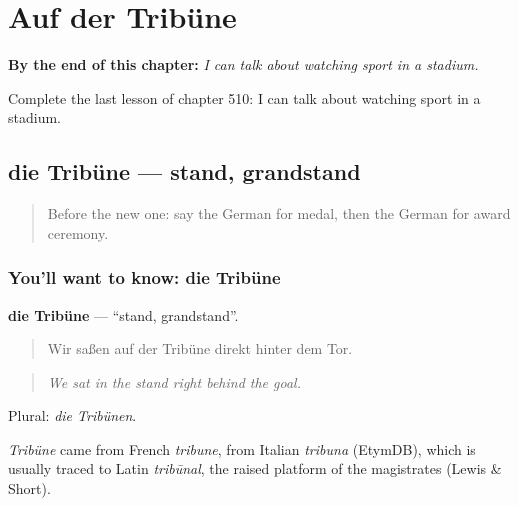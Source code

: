 
\chapter{Auf der Tribüne}
\label{ch:ge-auf-der-tribune}

\begin{chapteropening}
\textbf{By the end of this chapter:} \emph{I can talk about watching sport in a stadium.}

Complete the last lesson of chapter 510: I can talk about watching sport in a stadium.
\end{chapteropening}

\section[die Tribüne]{die Tribüne — stand, grandstand}

\label{lesson:GE-C510-tribuene}



\begin{quote}
Before the new one: say the German for medal, then the German for award ceremony.
\end{quote}

\subsection*{You'll want to know: die Tribüne}
\textbf{die Tribüne} — \textquotedblleft{}stand, grandstand\textquotedblright{}.

\begin{quote}
Wir saßen auf der Tribüne direkt hinter dem Tor.
\end{quote}

\begin{quote}
\emph{We sat in the stand right behind the goal.}
\end{quote}

Plural: \emph{die Tribünen}.

\begin{cousinweb}
\emph{Tribüne} came from French \emph{tribune}, from Italian \emph{tribuna} (EtymDB), which is usually traced to Latin \emph{tribūnal}, the raised platform of the magistrates (Lewis \& Short).
\end{cousinweb}

